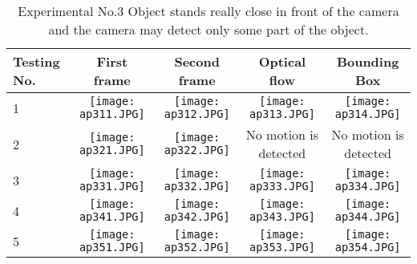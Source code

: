 \begin{table}[h]
	\begin{adjustwidth}{-1.2in}{-1.2in}%
		\begin{tabular}{|p{1.1cm}|c|c|c|c|}
			\hline
			Testing No. & First frame & Second frame & Optical flow & Bounding Box \\ \hline
			1 & 
			\texttt{[image: ap311.JPG]} & \texttt{[image: ap312.JPG]} & \texttt{[image: ap313.JPG]} & \texttt{[image: ap314.JPG]} \\
			2 & 
			\texttt{[image: ap321.JPG]} & \texttt{[image: ap322.JPG]} & No motion is detected & No motion is detected \\ %
			3 & 
			\texttt{[image: ap331.JPG]} & \texttt{[image: ap332.JPG]} & \texttt{[image: ap333.JPG]} & \texttt{[image: ap334.JPG]} \\
			4 & 
			\texttt{[image: ap341.JPG]} & \texttt{[image: ap342.JPG]} & \texttt{[image: ap343.JPG]} & \texttt{[image: ap344.JPG]} \\
			5 & 
			\texttt{[image: ap351.JPG]} & \texttt{[image: ap352.JPG]} & \texttt{[image: ap353.JPG]} & \texttt{[image: ap354.JPG]} \\
			\hline
		\end{tabular}
		\caption{Experimental No.3 Object stands really close in front of the camera and the camera may detect only some part of the object.}
		\label{tab:03}
	\end{adjustwidth}
\end{table}

